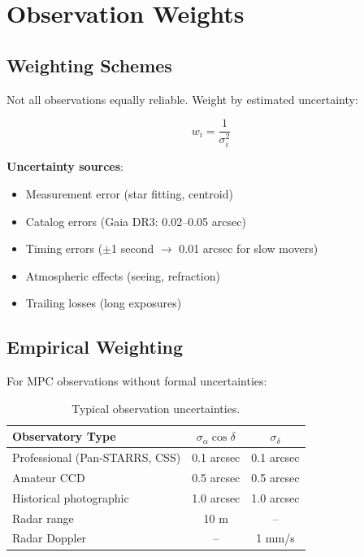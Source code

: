 \section{Observation Weights}

\subsection{Weighting Schemes}

Not all observations equally reliable. Weight by estimated uncertainty:

\begin{equation}
    w_i = \frac{1}{\sigma_i^2}
\end{equation}

\textbf{Uncertainty sources}:
\begin{itemize}
    \item Measurement error (star fitting, centroid)
    \item Catalog errors (Gaia DR3: 0.02--0.05 arcsec)
    \item Timing errors ($\pm$1 second $\to$ 0.01 arcsec for slow movers)
    \item Atmospheric effects (seeing, refraction)
    \item Trailing losses (long exposures)
\end{itemize}

\subsection{Empirical Weighting}

For MPC observations without formal uncertainties:

\begin{table}[htbp]
\centering
\begin{tabular}{lcc}
\toprule
\textbf{Observatory Type} & \textbf{$\sigma_\alpha \cos\delta$} & \textbf{$\sigma_\delta$} \\
\midrule
Professional (Pan-STARRS, CSS) & 0.1 arcsec & 0.1 arcsec \\
Amateur CCD & 0.5 arcsec & 0.5 arcsec \\
Historical photographic & 1.0 arcsec & 1.0 arcsec \\
Radar range & 10 m & -- \\
Radar Doppler & -- & 1 mm/s \\
\bottomrule
\end{tabular}
\caption{Typical observation uncertainties.}
\label{tab:obs_uncertainties}
\end{table}

